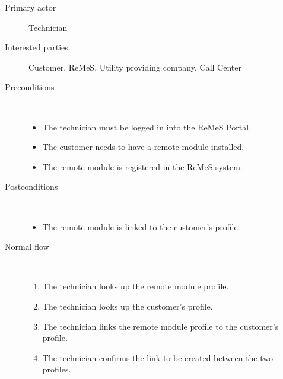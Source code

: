 \begin{description}
	\item[Primary actor] Technician
	\item[Interested parties] Customer, ReMeS, Utility providing company, Call
	Center
	\item[Preconditions] \  
	\begin{itemize}
		\item The technician must be logged in into the ReMeS Portal.
		\item The customer needs to have a remote module installed.
		\item The remote module is registered in the ReMeS system.
	\end{itemize}
	\item[Postconditions] \ 
	\begin{itemize}
		\item The remote module is linked to the customer's profile.
	\end{itemize}
	\item[Normal flow] \ 
	\begin{enumerate}
	  	\item The technician looks up the remote module profile.
	  	\item The technician looks up the customer's profile.
	  	\item The technician links the remote module profile to the customer's profile.
	  	\item The technician confirms the link to be created between the two
	  	profiles.
	\end{enumerate}
\end{description}